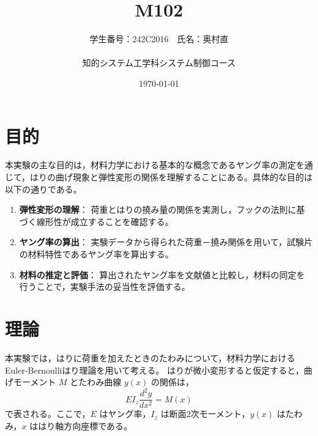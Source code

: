 \documentclass[10pt,a4paper,titlepage]{jreport}
\title{M102}
\author{
  学生番号：242C2016　氏名：奥村直 \\
  \\
  知的システム工学科システム制御コース
}
\date{\today}
\begin{document}
\maketitle

\chapter{目的}

本実験の主な目的は，材料力学における基本的な概念であるヤング率の測定を通じて，はりの曲げ現象と弾性変形の関係を理解することにある。具体的な目的は以下の通りである。

\begin{enumerate}
    \item \textbf{弾性変形の理解}：
    荷重とはりの撓み量の関係を実測し，フックの法則に基づく線形性が成立することを確認する。

    \item \textbf{ヤング率の算出}：
    実験データから得られた荷重－撓み関係を用いて，試験片の材料特性であるヤング率を算出する。

    \item \textbf{材料の推定と評価}：
    算出されたヤング率を文献値と比較し，材料の同定を行うことで，実験手法の妥当性を評価する。
\end{enumerate}

\chapter{理論}

本実験では，はりに荷重を加えたときのたわみについて，材料力学におけるEuler-Bernoulliはり理論を用いて考える。
はりが微小変形すると仮定すると，曲げモーメント $M$ とたわみ曲線 $y(x)$ の関係は，
\begin{equation}
    EI_z \frac{d^2y}{dx^2} = M(x)
\end{equation}
で表される。ここで，$E$ はヤング率，$I_z$ は断面2次モーメント，$y(x)$ はたわみ，$x$ ははり軸方向座標である。
\end{document}
